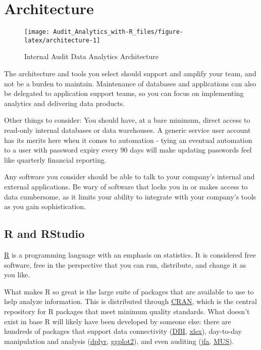 \documentclass[
]{book}
\begin{document}
\hypertarget{architecture}{%
\chapter{Architecture}\label{architecture}}

\begin{figure}

{\centering \texttt{[image: Audit\_Analytics\_with-R\_files/figure-latex/architecture-1]} 

}

\caption{Internal Audit Data Analytics Architecture}\label{fig:architecture}
\end{figure}

The architecture and tools you select should support and amplify your team, and not be a burden to maintain. Maintenance of databases and applications can also be delegated to application support teams, so you can focus on implementing analytics and delivering data products.

Other things to consider: You should have, at a bare minimum, direct access to read-only internal databases or data warehouses. A generic service user account has its merits here when it comes to automation - tying an eventual automation to a user with password expiry every 90 days will make updating passwords feel like quarterly financial reporting.

Any software you consider should be able to talk to your company's internal and external applications. Be wary of software that locks you in or makes access to data cumbersome, as it limits your ability to integrate with your company's tools as you gain sophistication.

\hypertarget{architecture-r}{%
\section{R and RStudio}\label{architecture-r}}

\href{https://www.r-project.org}{R} is a programming language with an emphasis on statistics. It is considered free software, free in the perspective that you can run, distribute, and change it as you like.

What makes R so great is the large suite of packages that are available to use to help analyze information. This is distributed through \href{https://cran.r-project.org}{CRAN}, which is the central repository for R packages that meet minimum quality standards. What doesn't exist in base R will likely have been developed by someone else: there are hundreds of packages that support data connectivity (\href{https://cran.r-project.org/web/packages/DBI/}{DBI}, \href{https://cran.r-project.org/web/packages/xlsx/}{xlsx}), day-to-day manipulation and analysis (\href{https://cran.r-project.org/web/packages/dplyr/}{dplyr}, \href{https://cran.r-project.org/web/packages/ggplot2/}{ggplot2}), and even auditing (\href{https://cran.r-project.org/web/packages/jfa/}{jfa}, \href{https://cran.r-project.org/web/packages/MUS/}{MUS}).
\end{document}
